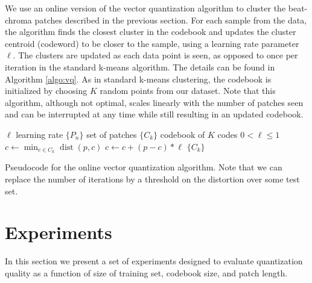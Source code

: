 \documentclass{article}
\DeclareMathOperator*{\dist}{dist}
\begin{document}
We use an online version of the vector quantization algorithm
\cite{Gersho1991} to cluster the beat-chroma patches described in the
previous section.
For each sample from the data, the algorithm finds the closest cluster
in the codebook and updates the cluster centroid (codeword) to be
closer to the sample, using a learning rate parameter $\ell$.
The clusters are updated as each data point is seen, as opposed to
once per iteration in the standard k-means algorithm.
The details can be found in Algorithm \ref{algo:vq}.
%
As in standard k-means clustering, the codebook is initialized by
choosing $K$ random points from our dataset.
%
Note that this algorithm, although not optimal, scales linearly with
the number of patches seen and can be interrupted at any time
while still resulting in an updated codebook. %

\begin{algorithm}
\begin{algorithmic}
\STATE$\ell$ learning rate
\STATE$\{P_n\}$ set of patches
\STATE$\{C_k\}$ codebook of $K$ codes
\REQUIRE $0 < \ell \leq 1$
\STATE$c \leftarrow \min_{c \in C_k} \dist(p,c)$
\STATE$c \leftarrow c + (p - c) * \ell$
\ENDFOR
\ENDFOR
\RETURN $\{C_k\}$
\caption{\small{Pseudocode for the online vector quantization
    algorithm. Note that we can replace the number of iterations by a
    threshold on the distortion over some test set.}
\label{algo:vq}}
\end{algorithmic}
\end{algorithm}



\section{Experiments}\label{sec:experiments}

In this section we present a set of experiments designed to evaluate
quantization quality as a function of size of training set, codebook
size, and patch length.
\end{document}
